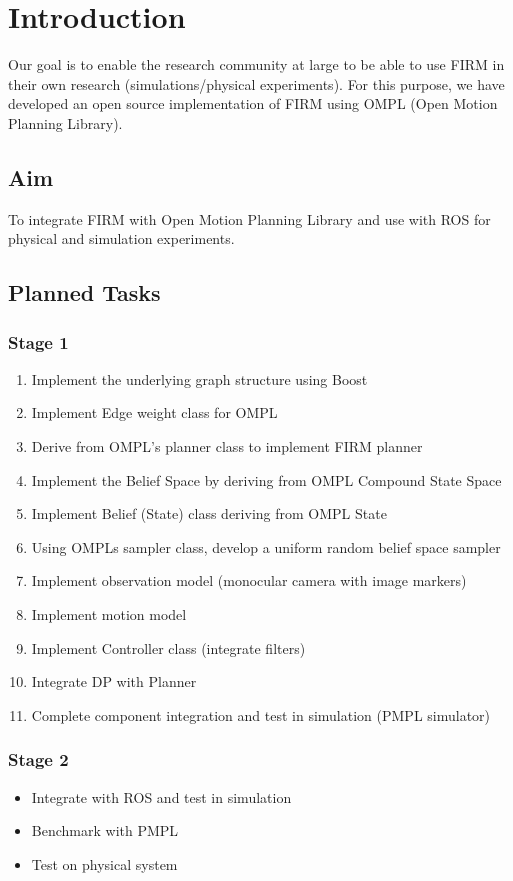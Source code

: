 \chapter{Introduction}

Our goal is to enable the research community at large to be able to use FIRM in their own research (simulations/physical experiments).
For this purpose, we have developed an open source implementation of FIRM using OMPL (Open Motion Planning Library).


\section{Aim}

To integrate FIRM with Open Motion Planning Library and use with ROS for physical and simulation experiments.

\section{Planned Tasks}

\subsection{Stage 1}
\begin{enumerate}
 \item Implement the underlying graph structure using Boost
 \item Implement Edge weight class for OMPL
 \item Derive from OMPL’s planner class to implement FIRM planner
 \item Implement the Belief Space by deriving from OMPL Compound State Space
 \item Implement Belief (State) class deriving from OMPL State
 \item Using OMPLs sampler class, develop a uniform random belief space sampler
 \item Implement observation model (monocular camera with image markers)
 \item Implement motion model
 \item Implement Controller class (integrate filters)
 \item Integrate DP with Planner
 \item Complete component integration and test in simulation (PMPL simulator)
\end{enumerate}

\subsection{Stage 2}

\begin{itemize}
 \item Integrate with ROS and test in simulation
 \item Benchmark with PMPL
 \item Test on physical system
\end{itemize}


